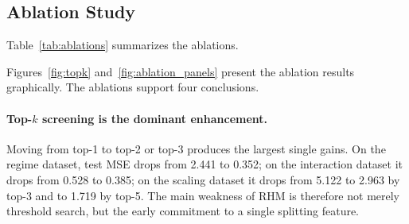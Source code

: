 \documentclass[11pt,a4paper]{article}
\begin{document}
\subsection{Ablation Study}

Table~\ref{tab:ablations} summarizes the ablations.

\begin{table}[ht]
\centering
\caption{Ablation study: test MSE across datasets.}\label{tab:ablations}
\end{table}

Figures~\ref{fig:topk} and~\ref{fig:ablation_panels} present the ablation results graphically. The ablations support four conclusions.

\paragraph{Top-$k$ screening is the dominant enhancement.}
Moving from top-1 to top-2 or top-3 produces the largest single gains. On the regime dataset, test MSE drops from 2.441 to 0.352; on the interaction dataset it drops from 0.528 to 0.385; on the scaling dataset it drops from 5.122 to 2.963 by top-3 and to 1.719 by top-5. The main weakness of RHM is therefore not merely threshold search, but the early commitment to a single splitting feature.
\end{document}
